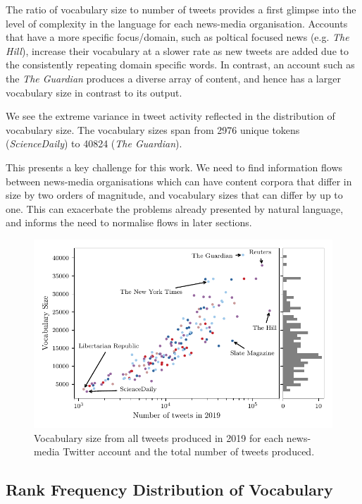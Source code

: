 The ratio of vocabulary size to number of tweets provides a first glimpse into the level of complexity in the language for each news-media organisation. Accounts that have a more specific focus/domain, such as poltical focused news (e.g. \emph{The Hill}), increase their vocabulary at a slower rate as new tweets are added due to the consistently repeating domain specific words. In contrast, an account such as the \emph{The Guardian} produces a diverse array of content, and hence has a larger vocabulary size in contrast to its output.

We see the extreme variance in tweet activity reflected in the distribution of vocabulary size. The vocabulary sizes span from 2976 unique tokens (\emph{ScienceDaily}) to 40824 (\emph{The Guardian}). 

This presents a key challenge for this work. We need to find information flows between news-media organisations which can have content corpora that differ in size by two orders of magnitude, and vocabulary sizes that can differ by up to one. This can exacerbate the problems already presented by natural language, and informs the need to normalise flows in later sections.


\begin{figure}[!htbp]
\centering
\includegraphics{chapter1/figs/vocab_vs_activity.pdf}
\caption{Vocabulary size from all tweets produced in 2019 for each news-media Twitter account and the total number of tweets produced.}\label{fig:data_vocabvsactivity}
\end{figure}

\subsection{Rank Frequency Distribution of Vocabulary}\label{sec:zipf_fit}

